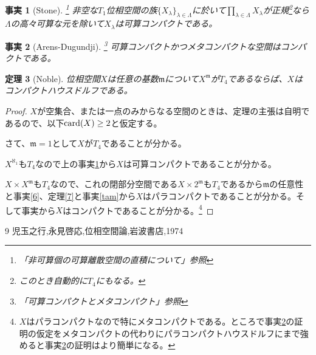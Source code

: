 \documentclass[leqno]{jsarticle}
\newtheorem{thm}{定理}
\newtheorem{fact}[thm]{事実}
\newcommand{\card}{\text{{\rm card}}}
\newcommand{\m}{\mathfrak{m}}
\begin{document}
\begin{fact}[Stone]\label{stone}\footnote{「非可算個の可算離散空間の直積について」参照}
非空な$T_1$位相空間の族$\{X_{\lambda}\}_{\lambda\in \Lambda}$に於いて$\displaystyle \prod_{\lambda\in \Lambda}X_{\lambda}$が正規\footnote{このとき自動的に$T_4$にもなる。}なら$\Lambda$の高々可算な元を除いて$X_{\lambda}$は可算コンパクトである。
\end{fact}

\begin{fact}[Arens-Dugundji]\label{AD}\footnote{「可算コンパクトとメタコンパクト」参照}
可算コンパクトかつメタコンパクトな空間はコンパクトである。
\end{fact}
\begin{thm}[Noble]
位相空間$X$は任意の基数$\m$について$X^{\m}$が$T_4$であるならば、$X$はコンパクトハウスドルフである。
\end{thm}
\begin{proof}
$X$が空集合、または一点のみからなる空間のときは、定理の主張は自明であるので、以下$\card(X)\ge 2$と仮定する。\par
さて、$\m=1$として$X$が$T_4$であることが分かる。\par
$X^{\aleph_1}$も$T_4$なので上の事実\ref{stone}から$X$は可算コンパクトであることが分かる。\par
$X\times X^{\m}$も$T_4$なので、これの閉部分空間である$X\times 2^{\m}$も$T_4$であるから$\m$の任意性と事実\ref{6}、定理\ref{7}と事実\ref{tam}から$X$はパラコンパクトであることが分かる。そして事実から$X$はコンパクトであることが分かる。\footnote{$X$はパラコンパクトなので特にメタコンパクトである。ところで事実\ref{AD}の証明の仮定をメタコンパクトの代わりにパラコンパクトハウスドルフにまで強めると事実\ref{AD}の証明はより簡単になる。}
\end{proof}














































	
\begin{thebibliography}{9}
児玉之行,永見啓応,位相空間論,岩波書店,1974
\end{thebibliography}




			
\end{document}
